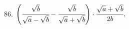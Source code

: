 86. $\left(\cfrac{\sqrt{b}}{\sqrt{a}-\sqrt{b}}-\cfrac{\sqrt{b}}{\sqrt{a}+\sqrt{b}}\right)\cdot\cfrac{\sqrt{a}+\sqrt{b}}{2b},$\qquad\qquad

